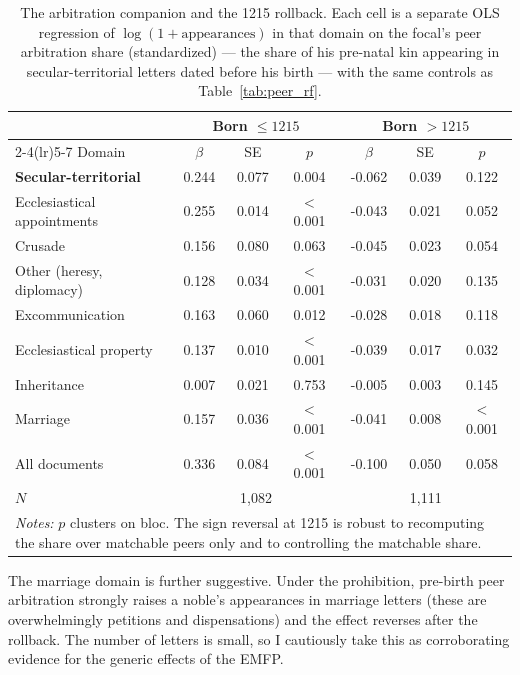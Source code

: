 \documentclass[12pt]{article}
\theoremstyle{definition}
\theoremstyle{remark}
\begin{document}
\begin{table}[!t]
\centering
\caption{The arbitration companion and the 1215 rollback. Each cell is a separate OLS regression of $\log(1+\text{appearances})$ in that domain on the focal's peer arbitration share (standardized) --- the share of his pre-natal kin appearing in secular-territorial letters dated before his birth --- with the same controls as Table~\ref{tab:peer_rf}.}
\label{tab:peer_flip}
{\small
\begin{tabular}{lcccccc}
\toprule
 & \multicolumn{3}{c}{Born $\leq 1215$} & \multicolumn{3}{c}{Born $> 1215$} \\
\cmidrule(lr){2-4}\cmidrule(lr){5-7}
Domain & $\beta$ & SE & $p$ & $\beta$ & SE & $p$ \\
\midrule
\textbf{Secular-territorial} & 0.244 & 0.077 & 0.004 & -0.062 & 0.039 & 0.122 \\
Ecclesiastical appointments & 0.255 & 0.014 & $<$0.001 & -0.043 & 0.021 & 0.052 \\
Crusade & 0.156 & 0.080 & 0.063 & -0.045 & 0.023 & 0.054 \\
Other (heresy, diplomacy) & 0.128 & 0.034 & $<$0.001 & -0.031 & 0.020 & 0.135 \\
Excommunication & 0.163 & 0.060 & 0.012 & -0.028 & 0.018 & 0.118 \\
Ecclesiastical property & 0.137 & 0.010 & $<$0.001 & -0.039 & 0.017 & 0.032 \\
Inheritance & 0.007 & 0.021 & 0.753 & -0.005 & 0.003 & 0.145 \\
Marriage & 0.157 & 0.036 & $<$0.001 & -0.041 & 0.008 & $<$0.001 \\
All documents & 0.336 & 0.084 & $<$0.001 & -0.100 & 0.050 & 0.058 \\
\midrule
$N$ & \multicolumn{3}{c}{1,082} & \multicolumn{3}{c}{1,111} \\
\midrule
\multicolumn{7}{p{0.9\textwidth}}{\footnotesize \textit{Notes:} $p$ clusters on bloc. The sign reversal at 1215 is robust to recomputing the share over matchable peers only and to controlling the matchable share.} \\
\bottomrule
\end{tabular}
}
\end{table}



The marriage domain is further suggestive. Under the prohibition, pre-birth peer arbitration strongly raises a noble's appearances in marriage letters (these are overwhelmingly petitions and dispensations) and the effect reverses after the rollback. The number of letters is small, so I cautiously take this as corroborating evidence for the generic effects of the EMFP.
\end{document}
